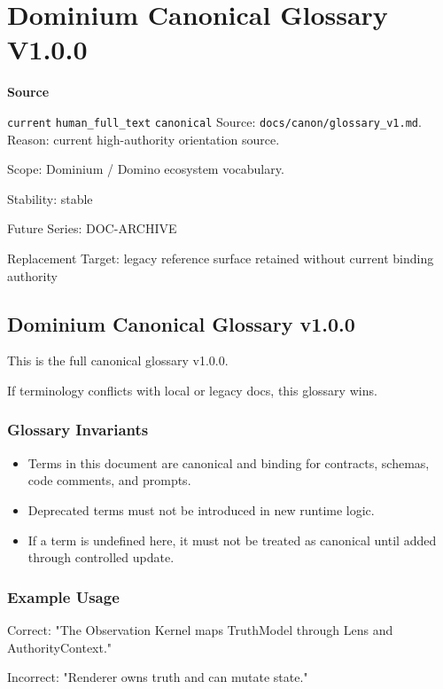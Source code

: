 \documentclass[9pt,a4paper,openany]{book}
\newcommand{\vonecallout}[3]{\par\medskip\noindent\begingroup\setlength{\fboxsep}{7pt}\colorbox{DomCalloutBg}{\parbox{0.94\linewidth}{\textbf{\textcolor{#1}{#2}}\par #3}}\endgroup\par\medskip}
\newcommand{\vonecode}[1]{\par\smallskip\noindent\begingroup\setlength{\fboxsep}{7pt}\colorbox{DomCodeBg}{\parbox{0.94\linewidth}{\footnotesize\ttfamily #1}}\endgroup\par\smallskip}
\begin{document}
\section{Dominium Canonical Glossary V1.0.0}

\vonecallout{DomSlate}{Source}{\texttt{current} \texttt{human\_\allowbreak{}full\_\allowbreak{}text} \texttt{canonical} Source: \texttt{docs/\allowbreak{}canon/\allowbreak{}glossary\_\allowbreak{}v1.\allowbreak{}md}.\allowbreak{} Reason: current high-\allowbreak{}authority orientation source.\allowbreak{}}

Scope: Dominium /\allowbreak{} Domino ecosystem vocabulary.\allowbreak{}

Stability: stable

Future Series: DOC-\allowbreak{}ARCHIVE

Replacement Target: legacy reference surface retained without current binding authority


\subsection{Dominium Canonical Glossary v1.0.0}

This is the full canonical glossary v1.\allowbreak{}0.\allowbreak{}0.\allowbreak{}

If terminology conflicts with local or legacy docs, this glossary wins.\allowbreak{}


\subsubsection{Glossary Invariants}
\begin{itemize}
\item Terms in this document are canonical and binding for contracts, schemas, code comments, and prompts.\allowbreak{}
\item Deprecated terms must not be introduced in new runtime logic.\allowbreak{}
\item If a term is undefined here, it must not be treated as canonical until added through controlled update.\allowbreak{}
\end{itemize}

\subsubsection{Example Usage}
\vonecode{Correct: "The Observation Kernel maps TruthModel through Lens and AuthorityContext.\allowbreak{}"\par
Incorrect: "Renderer owns truth and can mutate state.\allowbreak{}"\par}
\end{document}

